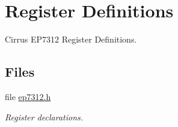 \hypertarget{group__edb7312__registers}{}\section{Register Definitions}
\label{group__edb7312__registers}


Cirrus E\+P7312 Register Definitions.  


\subsection*{Files}
\begin{DoxyCompactItemize}
\item 
file \mbox{\hyperlink{ep7312_8h}{ep7312.\+h}}
\begin{DoxyCompactList}\small\item\em Register declarations. \end{DoxyCompactList}\end{DoxyCompactItemize}
